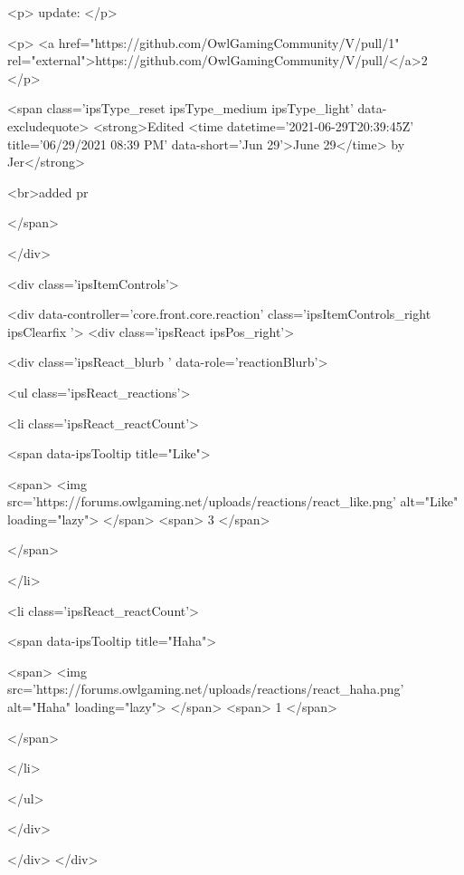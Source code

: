 <p>
	update:
</p>

<p>
	<a href="https://github.com/OwlGamingCommunity/V/pull/1" rel="external">https://github.com/OwlGamingCommunity/V/pull/</a>2
</p>


			
				

<span class='ipsType_reset ipsType_medium ipsType_light' data-excludequote>
	<strong>Edited <time datetime='2021-06-29T20:39:45Z' title='06/29/2021 08:39  PM' data-short='Jun 29'>June 29</time> by Jer</strong>
	
		<br>added pr
	
	
</span>
			
		</div>

		
			<div class='ipsItemControls'>
				
					
						

	<div data-controller='core.front.core.reaction' class='ipsItemControls_right ipsClearfix '>	
		<div class='ipsReact ipsPos_right'>
			
				
				<div class='ipsReact_blurb ' data-role='reactionBlurb'>
					
						

	
	<ul class='ipsReact_reactions'>
		
		
			
				
				<li class='ipsReact_reactCount'>
					
						<span data-ipsTooltip title="Like">
					
							<span>
								<img src='https://forums.owlgaming.net/uploads/reactions/react_like.png' alt="Like" loading="lazy">
							</span>
							<span>
								3
							</span>
					
						</span>
					
				</li>
			
		
			
				
				<li class='ipsReact_reactCount'>
					
						<span data-ipsTooltip title="Haha">
					
							<span>
								<img src='https://forums.owlgaming.net/uploads/reactions/react_haha.png' alt="Haha" loading="lazy">
							</span>
							<span>
								1
							</span>
					
						</span>
					
				</li>
			
		
	</ul>

					
				</div>
			
			
			
		</div>
	</div>

